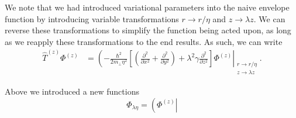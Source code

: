 We note that we had introduced
variational parameters into the naive envelope function by introducing variable
transformations $r \rightarrow r/\eta$ and $z \rightarrow \lambda z$. We can
reverse these transformations to simplify the function being acted upon, as long
as we reapply these transformations to the end results. As such, we can write
\begin{align}
\hat{T}^{(z)}\Phi^{\left(z\right)}
  & =
  \left(
    - \frac{\hbar^2}{2m_\perp\eta^{2}}
    \left[
      \left(
          \frac{\partial^2}{\partial x^2}
          +
          \frac{\partial^2}{\partial y^2}
        \right)
      +\lambda^{2}\gamma\frac{\partial^2}{\partial z^2}
    \right]
    \Phi^{\left(z\right)}
  \right|_{\substack{r \rightarrow r/\eta \\ z \rightarrow \lambda z}}
.
\end{align}


Above we introduced a new functions
\begin{equation}
  \Phi_{\lambda\eta} = \left(\Phi^{\left(z\right)}\right|
\end{equation}
